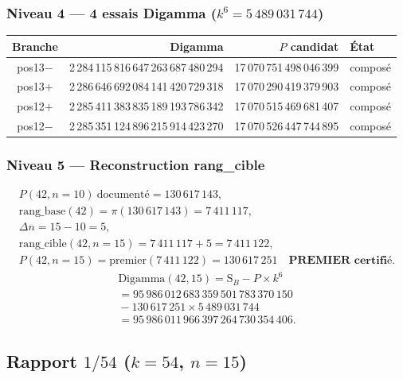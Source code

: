 \documentclass[11pt,a4paper]{article}
\newcommand{\SB}{\mathrm{S}_B}
\begin{document}
\subsubsection{Niveau 4 --- 4 essais Digamma ($k^{6} = 5\,489\,031\,744$)}

\begin{center}\small
\begin{tabular}{@{}c r r l@{}}
\toprule
\rowcolor{spectralgris}
Branche & Digamma & $P$ candidat & État \\
\midrule
pos13$-$ & 2\,284\,115\,816\,647\,263\,687\,480\,294 & 17\,070\,751\,498\,046\,399 & composé \\
pos13$+$ & 2\,286\,646\,692\,084\,141\,420\,729\,318 & 17\,070\,290\,419\,379\,903 & composé \\
pos12$+$ & 2\,285\,411\,383\,835\,189\,193\,786\,342 & 17\,070\,515\,469\,681\,407 & composé \\
pos12$-$ & 2\,285\,351\,124\,896\,215\,914\,423\,270 & 17\,070\,526\,447\,744\,895 & composé \\
\bottomrule
\end{tabular}
\end{center}

\subsubsection{Niveau 5 --- Reconstruction rang\_cible}
\begin{gather*}
P(42,n{=}10)\ \text{documenté}=130\,617\,143,\\
\text{rang\_base}(42)=\pi(130\,617\,143)=7\,411\,117,\\
\Delta n=15-10=5,\\
\text{rang\_cible}(42,n{=}15)=7\,411\,117+5=7\,411\,122,\\
P(42,n{=}15)=\text{premier}(7\,411\,122)=130\,617\,251
\quad\textbf{PREMIER certifié}.
\end{gather*}
\begin{multline*}
\text{Digamma}(42,15)=\SB-P\times k^{6}\\
=95\,986\,012\,683\,359\,501\,783\,370\,150\\
{}-130\,617\,251\times5\,489\,031\,744\\
=95\,986\,011\,966\,397\,264\,730\,354\,406.
\end{multline*}

\subsection{Rapport $1/54$ ($k = 54$, $n = 15$)}
\end{document}
